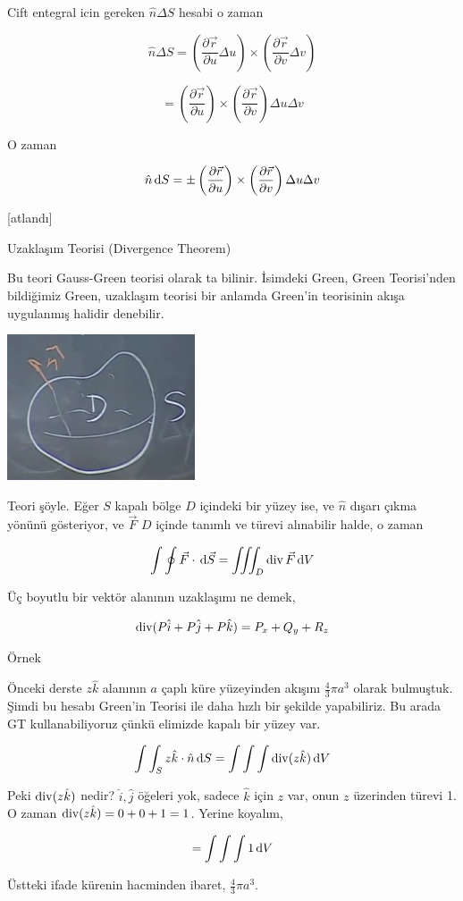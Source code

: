 \documentclass[12pt,fleqn]{article}\usepackage{../../common}
\begin{document}
Cift entegral icin gereken $\hat{n} \Delta S$ hesabi o zaman

$$
\hat{n} \Delta S =
\left( \frac{\partial \vec{r}}{\partial u} \Delta u \right) \times
\left( \frac{\partial \vec{r}}{\partial v} \Delta v \right) 
$$

$$
= \left( \frac{\partial \vec{r}}{\partial u} \right) \times
\left( \frac{\partial \vec{r}}{\partial v}  \right) \Delta u \Delta v
$$

O zaman

$$
\hat{n} \,\mathrm{d} S = \pm
\left( \frac{\partial \vec{r}}{\partial u} \right) \times
\left( \frac{\partial \vec{r}}{\partial v}  \right) \Delta u \Delta v
$$

[atlandı]

Uzaklaşım Teorisi (Divergence Theorem)

Bu teori Gauss-Green teorisi olarak ta bilinir. İsimdeki Green, Green
Teorisi'nden bildiğimiz Green, uzaklaşım teorisi bir anlamda Green'in teorisinin
akışa uygulanmış halidir denebilir.

\includegraphics[width=15em]{calc_multi_28_06.png}

Teori şöyle. Eğer $S$ kapalı bölge $D$ içindeki bir yüzey ise, ve $\hat{n}$
dışarı çıkma yönünü gösteriyor, ve $\vec{F}$ $D$ içinde tanımlı ve türevi
alınabilir halde, o zaman

$$
\int \oint \vec{F} \cdot \,\mathrm{d} \vec{S} =
\iiint_D \operatorname{div} \vec{F} \,\mathrm{d} V
$$

Üç boyutlu bir vektör alanının uzaklaşımı ne demek,

$$
\operatorname{div} (P \hat{i} + P \hat{j} + P \hat{k} ) = P_x + Q_y + R_z
$$

Örnek

Önceki derste $z \hat{k}$ alanının $a$ çaplı küre yüzeyinden akışını
$\frac{4}{3} \pi a^3$ olarak bulmuştuk. Şimdi bu hesabı Green'in Teorisi
ile daha hızlı bir şekilde yapabiliriz. Bu arada GT kullanabiliyoruz çünkü
elimizde kapalı bir yüzey var.

$$
\int \int_S z \hat{k} \cdot \hat{n} \,\mathrm{d} S =
\int \int \int \operatorname{div} (z\hat{k}) \,\mathrm{d} V
$$

Peki $\operatorname{div} (z\hat{k})$ nedir? $\hat{i},\hat{j}$ öğeleri yok, sadece
$\hat{k}$ için $z$ var, onun $z$ üzerinden türevi 1. O zaman
$\operatorname{div} (z\hat{k}) = 0 + 0 + 1 = 1$. Yerine koyalım,

$$
= \int \int \int 1 \,\mathrm{d} V
$$

Üstteki ifade kürenin hacminden ibaret, $\frac{4}{3} \pi a^3$. 
\end{document}
